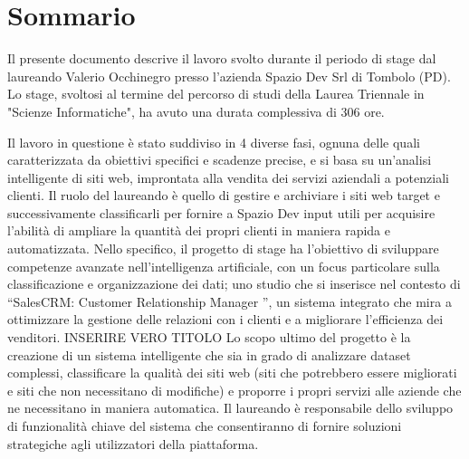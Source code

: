 \cleardoublepage
{}
{}
\begingroup
\let\clearpage\relax
\let\cleardoublepage\relax
\let\cleardoublepage\relax

\chapter*{Sommario}

Il presente documento descrive il lavoro svolto durante il periodo di stage dal laureando
Valerio Occhinegro presso l’azienda Spazio Dev Srl di Tombolo (PD). Lo stage, svoltosi al termine del percorso di studi della Laurea Triennale in "Scienze Informatiche", ha avuto una durata complessiva di 306 ore.

Il lavoro in questione è stato suddiviso in 4 diverse fasi, ognuna delle quali caratterizzata da obiettivi specifici e scadenze precise, e si basa su un'analisi intelligente di siti web, improntata alla vendita dei servizi aziendali a potenziali clienti. Il ruolo del laureando è quello di gestire e archiviare i siti web target e successivamente classificarli per fornire a Spazio Dev input utili per acquisire l'abilità di ampliare la quantità dei propri clienti in maniera rapida e automatizzata. 
Nello specifico, il progetto di stage ha l’obiettivo di sviluppare competenze avanzate nell’intelligenza artificiale, con un focus
particolare sulla classificazione e organizzazione dei dati; uno studio che si inserisce nel contesto di
{“SalesCRM: Customer Relationship Manager ”, un sistema integrato che mira a ottimizzare la gestione delle relazioni con i clienti e a migliorare l’efficienza dei venditori.} INSERIRE VERO TITOLO
Lo scopo ultimo del progetto è la creazione di un sistema intelligente che sia in grado di analizzare dataset complessi,
classificare la qualità dei siti web (siti che potrebbero essere migliorati e siti che non necessitano di modifiche) e proporre i propri servizi alle aziende che ne necessitano in maniera automatica. 
Il laureando è responsabile dello sviluppo di funzionalità chiave del sistema che consentiranno di fornire
soluzioni strategiche agli utilizzatori della piattaforma. 






\endgroup

\vfill
